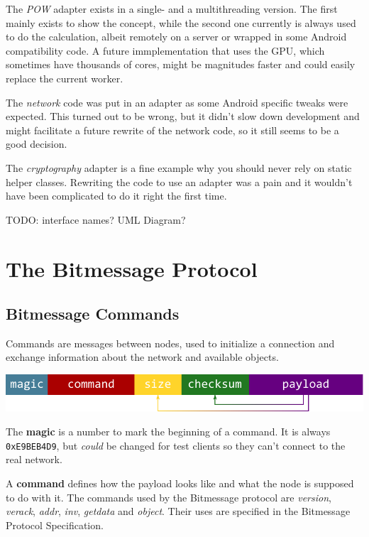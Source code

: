 \documentclass{bfh}
\begin{document}
  The \textit{\acl{POW}} adapter exists in a single- and a multithreading version. The first mainly exists to show the concept, while the second one currently is always used to do the calculation, albeit remotely on a server or wrapped in some Android compatibility code. A future immplementation that uses the \acs{GPU}, which sometimes have thousands of cores, might be magnitudes faster and could easily replace the current worker.

  The \textit{network} code was put in an adapter as some Android specific tweaks were expected. This turned out to be wrong, but it didn't slow down development and might facilitate a future rewrite of the network code, so it still seems to be a good decision.

  The \textit{cryptography} adapter is a fine example why you should never rely on static helper classes. Rewriting the code to use an adapter was a pain and it wouldn't have been complicated to do it right the first time.

TODO: interface names? UML Diagram?

  \newpage
  \section{The Bitmessage Protocol}

  \subsection{Bitmessage Commands}

  Commands are messages between nodes, used to initialize a connection and exchange information about the network and available objects.

  \includegraphics[width=\textwidth]{images/command.pdf}

  The \textbf{magic} is a number to mark the beginning of a command. It is always \texttt{0xE9BEB4D9}, but \textit{could} be changed for test clients so they can't connect to the real network.

  A \textbf{command} defines how the payload looks like and what the node is supposed to do with it. The commands used by the Bitmessage protocol are \textit{version}, \textit{verack}, \textit{addr}, \textit{inv}, \textit{getdata} and \textit{object}. Their uses are specified in the Bitmessage Protocol Specification.\cite{wiki:protocol}
\end{document}
